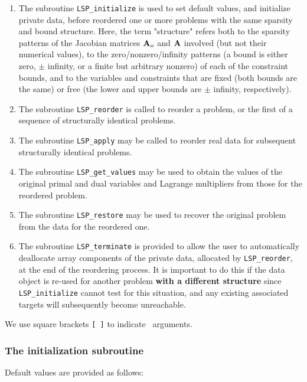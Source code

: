\documentclass{galahad}
\newcommand{\packagename}{LSP}
\begin{document}
\begin{enumerate}
\item The subroutine 
  {\tt \packagename\_initialize} 
  is used to set default 
  values, and initialize private data, before reordered one or more problems 
  with the same sparsity and bound structure. 
  Here, the term "structure" refers both to 
  the sparsity patterns of the Jacobian matrices ${\mathbf{A}}_o$  and ${\mathbf{A}}$ 
  involved 
  (but not their numerical values), to the zero/nonzero/infinity patterns 
  (a bound is either zero, $\pm$ infinity, or a finite but arbitrary 
  nonzero) of each of the constraint bounds, and to the variables and 
  constraints that are fixed (both bounds are the same) or free 
  (the lower and upper bounds are $\pm$ infinity, respectively). 
 
\item The subroutine 
  {\tt \packagename\_reorder} 
  is called to reorder a problem, or the first of a sequence of structurally 
  identical problems. 
 
\item The subroutine 
  {\tt \packagename\_apply} 
  may be called to reorder real data for subsequent structurally identical 
  problems. 
 
\item The subroutine 
  {\tt \packagename\_get\_values} 
  may be used to obtain the values of the original primal and dual variables 
  and Lagrange multipliers from those for the reordered problem. 
 
\item The subroutine {\tt \packagename\_restore} may be used to recover the 
  original problem from the data for the reordered one. 
 
\item The subroutine 
  {\tt \packagename\_terminate} 
  is provided to allow the user to automatically deallocate array components 
  of the private data,  allocated by 
  {\tt \packagename\_reorder}, 
  at the end of the reordering process. It is important to do this if the data 
  object is re-used for another problem {\bf with a different structure} 
  since {\tt \packagename\_initialize} cannot test for this situation, 
  and any existing associated targets will subsequently become unreachable. 
\end{enumerate}
We use square brackets {\tt [ ]} to indicate \optional\ arguments.


\subsubsection{The initialization subroutine}\label{subinit}
 Default values are provided as follows:
\vspace*{1mm}
\end{document}
